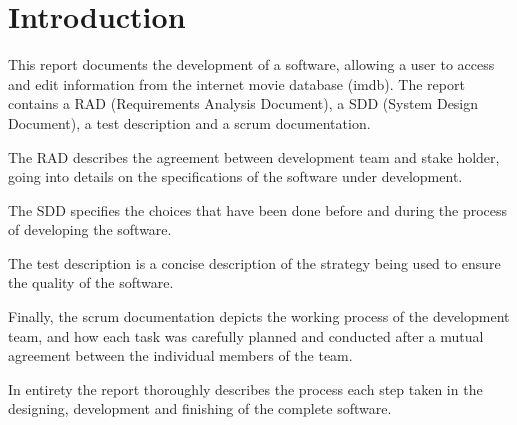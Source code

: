\chapter{Introduction}
This report documents the development of a software, allowing a user to access and edit information from the internet movie database (imdb).
The report contains a RAD (Requirements Analysis Document), a SDD (System Design Document), a test description and a scrum documentation.

The RAD describes the agreement between development team and stake holder, going into details on the specifications of the software under development.

The SDD specifies the choices that have been done before and during the process of developing the software.

The test description is a concise description of the strategy being used to ensure the quality of the software.

Finally, the scrum documentation depicts the working process of the development team, and how each task was carefully planned and conducted after a mutual agreement between the individual members of the team.

In entirety the report thoroughly describes the process each step taken in the designing, development and finishing of the complete software.

\newpage
